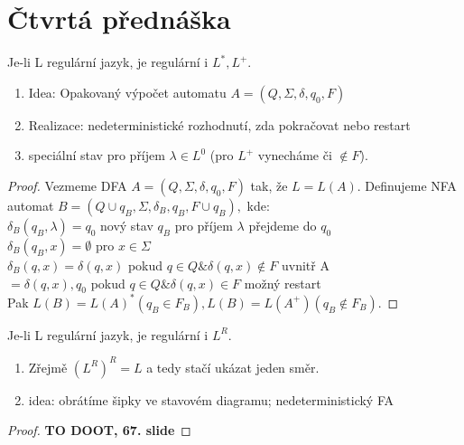 \documentclass[../main.tex]{subfiles}
\begin{document}
\section{Čtvrtá přednáška}

\begin{theorem}[Lemma($L^*,L^+$)]
    Je-li L regulární jazyk, je regulární i $L^*, L^+$.
    \begin{enumerate}
        \item Idea: Opakovaný výpočet automatu $A = (Q, \Sigma, \delta, q_0, F)$
        \item Realizace: nedeterministické rozhodnutí, zda pokračovat nebo restart
        \item speciální stav pro příjem $\lambda \in L^0$ (pro $L^+$ vynecháme či $\notin F$).
    \end{enumerate}
\end{theorem}
\begin{proof}
    Vezmeme DFA $A = (Q, \Sigma, \delta, q_0, F)$ tak, že $L = L(A)$.
    Definujeme NFA automat $B = (Q\cup {q_B}, \Sigma, \delta_B, {q_B}, F\cup {q_B}),$ kde:\\
    $\delta_B(q_B,\lambda) = {q_0}$ nový stav $q_B$ pro příjem $\lambda$ přejdeme do $q_0$\\
    $\delta_B(q_B,x) = \emptyset$ pro $x\in \Sigma$\\
    $\delta_B(q,x) = {\delta(q,x)}$ pokud $q \in Q \& \delta(q,x) \notin F$ uvnitř A\\
    $ = {\delta(q,x),q_0}$ pokud $q \in Q \& \delta(q,x) \in F$ možný restart\\
    Pak $L(B) = L(A)^* (q_B \in F_B), L(B) = L(A^+)(q_B\notin F_B)$.
\end{proof}

\begin{theorem}[Lemma($L^R$)]
    Je-li L regulární jazyk, je regulární i $L^R$.
    \begin{enumerate}
        \item Zřejmě $(L^R)^R = L$ a tedy stačí ukázat jeden směr.
        \item idea: obrátíme šipky ve stavovém diagramu; nedeterministický FA
    \end{enumerate}
\end{theorem}
\begin{proof}
    \textbf{TO DOOT, 67. slide}
\end{proof}
\end{document}
